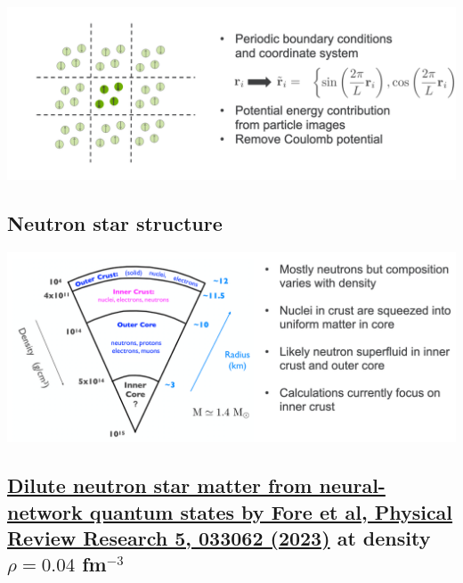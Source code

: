 \documentclass[%
oneside,                 %
final,                   %
10pt]{article}
\begin{document}
\vspace{6mm}

\centerline{\includegraphics[width=1.0\linewidth]{figures/mbpfig4.png}}

\vspace{6mm}

\subsection{Neutron star structure}

\vspace{6mm}

\centerline{\includegraphics[width=1.0\linewidth]{figures/mbpfig5.png}}

\vspace{6mm}

\subsection{\href{{https://journals.aps.org/prresearch/pdf/10.1103/PhysRevResearch.5.033062}}{Dilute neutron star matter from neural-network quantum states by Fore et al, Physical Review Research 5, 033062 (2023)} at density $\rho=0.04$ fm$^{-3}$}
\end{document}
